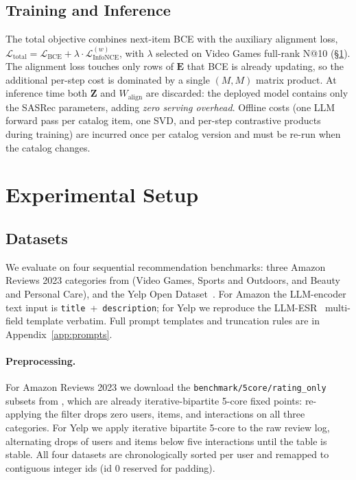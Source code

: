 \documentclass{article}
\begin{document}
\subsection{Training and Inference}

The total objective combines next-item BCE with the auxiliary alignment
loss,
$\mathcal{L}_\text{total} = \mathcal{L}_\text{BCE} + \lambda \cdot \mathcal{L}_\text{InfoNCE}^{(w)}$,
with $\lambda$ selected on Video Games full-rank N@10
(\S\ref{sec:experimental-setup}). The alignment loss touches only rows
of $\mathbf{E}$ that BCE is already updating, so the additional
per-step cost is dominated by a single $(M, M)$ matrix product. At inference time both $\mathbf{Z}$ and $W_\text{align}$ are
discarded: the deployed model contains only the SASRec parameters,
adding \emph{zero serving overhead}. Offline costs (one LLM forward pass per catalog item, one SVD,
and per-step contrastive products during training) are incurred
once per catalog version and must be re-run when the catalog changes.

\section{Experimental Setup}
\label{sec:experimental-setup}

\subsection{Datasets}
\label{sec:datasets}

We evaluate on four sequential recommendation benchmarks: three
Amazon Reviews 2023 categories from \citet{hou2024amazon} (Video
Games, Sports and Outdoors, and Beauty and Personal Care), and the
Yelp Open Dataset~\citep{yelpdataset}. For Amazon the LLM-encoder
text input is \texttt{title}~+~\texttt{description}; for Yelp we
reproduce the LLM-ESR~\citep{llmesr} multi-field template
verbatim. Full prompt templates and truncation rules are in
Appendix~\ref{app:prompts}.

\paragraph{Preprocessing.} For Amazon Reviews 2023 we download the
\texttt{benchmark/5core/rating\_only} subsets from
\citet{hou2024amazon}, which are already iterative-bipartite 5-core
fixed points: re-applying the filter drops zero users, items, and
interactions on all three categories. For Yelp we apply iterative
bipartite 5-core to the raw review log, alternating drops of users
and items below five interactions until the table is stable. All
four datasets are chronologically sorted per user and remapped to
contiguous integer ids (id 0 reserved for padding).
\end{document}

